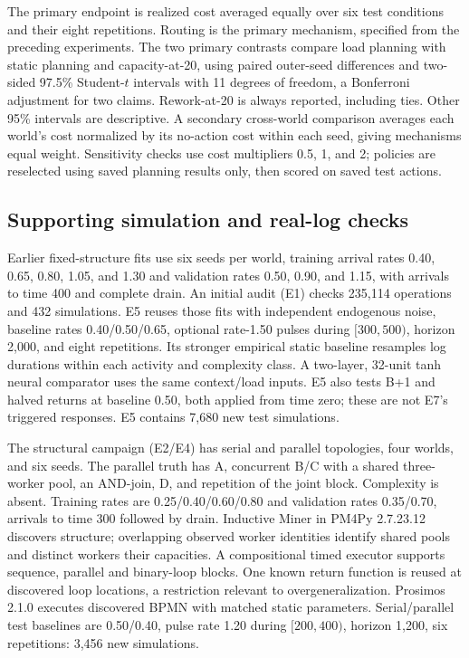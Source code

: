 \documentclass[runningheads]{llncs}
\begin{document}
The primary endpoint is realized cost averaged equally over six test conditions and their eight repetitions. Routing is the primary mechanism, specified from the preceding experiments. The two primary contrasts compare load planning with static planning and capacity-at-20, using paired outer-seed differences and two-sided 97.5\% Student-$t$ intervals with 11 degrees of freedom, a Bonferroni adjustment for two claims. Rework-at-20 is always reported, including ties. Other 95\% intervals are descriptive. A secondary cross-world comparison averages each world's cost normalized by its no-action cost within each seed, giving mechanisms equal weight. Sensitivity checks use cost multipliers 0.5, 1, and 2; policies are reselected using saved planning results only, then scored on saved test actions.

\subsection{Supporting simulation and real-log checks}
Earlier fixed-structure fits use six seeds per world, training arrival rates 0.40, 0.65, 0.80, 1.05, and 1.30 and validation rates 0.50, 0.90, and 1.15, with arrivals to time 400 and complete drain. An initial audit (E1) checks 235,114 operations and 432 simulations. E5 reuses those fits with independent endogenous noise, baseline rates 0.40/0.50/0.65, optional rate-1.50 pulses during $[300,500)$, horizon 2,000, and eight repetitions. Its stronger empirical static baseline resamples log durations within each activity and complexity class. A two-layer, 32-unit tanh neural comparator uses the same context/load inputs. E5 also tests B+1 and halved returns at baseline 0.50, both applied from time zero; these are not E7's triggered responses. E5 contains 7,680 new test simulations.

The structural campaign (E2/E4) has serial and parallel topologies, four worlds, and six seeds. The parallel truth has A, concurrent B/C with a shared three-worker pool, an AND-join, D, and repetition of the joint block. Complexity is absent. Training rates are 0.25/0.40/0.60/0.80 and validation rates 0.35/0.70, arrivals to time 300 followed by drain. Inductive Miner in PM4Py 2.7.23.12 discovers structure; overlapping observed worker identities identify shared pools and distinct workers their capacities. A compositional timed executor supports sequence, parallel and binary-loop blocks. One known return function is reused at discovered loop locations, a restriction relevant to overgeneralization. Prosimos 2.1.0 executes discovered BPMN with matched static parameters. Serial/parallel test baselines are 0.50/0.40, pulse rate 1.20 during $[200,400)$, horizon 1,200, six repetitions: 3,456 new simulations.
\end{document}
